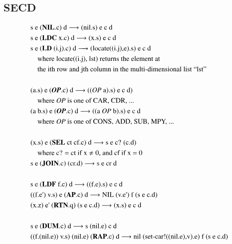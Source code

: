 \documentclass[a4paper,12pt,twoside,openright]{report}
\theoremstyle{definition}
\newcommand{\ts}{\textquotesingle}
\begin{document}
\begin{appendices}
\chapter{SECD}
\begin{figure}[htp!]
    \centering
    \begin{align*}
    & \text{s e (\textbf{NIL}.c) d} \longrightarrow \text{(nil.s) e c d} \\
    & \text{s e (\textbf{LDC} x.c) d} \longrightarrow \text{(x.s) e c d} \\
    & \text{s e (\textbf{LD} (i.j).c) d} \longrightarrow \text{(locate((i.j),e).s) e c d} \\ 
    & \quad\text{where locate((i.j), lst) returns the element at} \\
    & \quad\text{the ith row and jth column in the multi-dimensional list ``lst''} \\ \\%
    & \text{(a.s) e (\textbf{\textit{OP}}.c) d} \longrightarrow \text{((\textit{OP} a).s) e c d)} \\
    & \quad\text{where \textit{OP} is one of CAR, CDR, ...} \\
    & \text{(a b.s) e (\textbf{\textit{OP}}.c) d} \longrightarrow \text{((a \textit{OP} b).s) e c d} \\
    & \quad\text{where \textit{OP} is one of CONS, ADD, SUB, MPY, ...} \\ \\%
    & \text{(x.s) e (\textbf{SEL} ct cf.c) d} \longrightarrow \text{s e c? (c.d)} \\
    & \quad\text{where c? = ct if x} \neq \text{0, and cf if x = 0} \\
    & \text{s e (\textbf{JOIN}.c) (cr.d)} \longrightarrow \text{s e cr d} \\ \\%
    & \text{s e (\textbf{LDF} f.c) d} \longrightarrow \text{((f.e).s) e c d} \\
    & \text{((f.e{\ts}) v.s) e (\textbf{AP}.c) d} \longrightarrow \text{NIL (v.e{\ts}) f (s e c.d)} \\
    & \text{(x.z) e{\ts} (\textbf{RTN}.q) (s e c.d)} \longrightarrow \text{(x.s) e c d} \\ \\%
    & \text{s e (\textbf{DUM}.c) d} \longrightarrow \text{s (nil.e) c d} \\
    & \text{((f.(nil.e)) v.s) (nil.e) (\textbf{RAP}.c) d} \longrightarrow \text{nil (set-car!((nil.e),v).e) f (s e c.d)} \\

\end{align*}
\end{figure}
\end{appendices}
\end{document}
